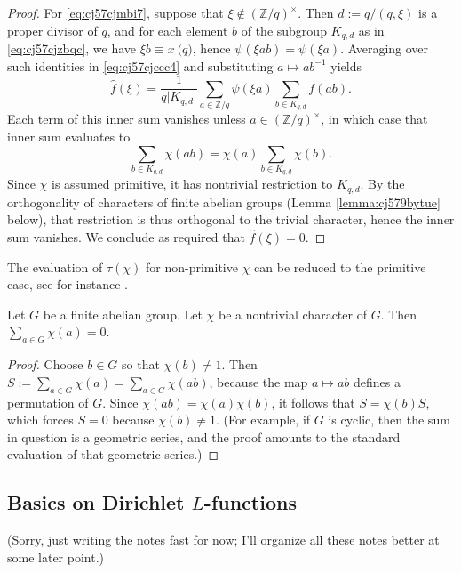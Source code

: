 \documentclass[reqno]{amsart}  \numberwithin{theorem}{section} \numberwithin{equation}{section}
\begin{document}
\begin{proof}
  For \eqref{eq:cj57cjmbi7}, suppose that $\xi \notin (\mathbb{Z} / q)^\times$.  Then $d := q / (q,\xi)$ is a proper divisor of $q$, and for each element $b$ of the subgroup $K_{q, d}$ as in \eqref{eq:cj57cjzbqc}, we have $\xi b \equiv x \pod{q}$, hence $\psi (\xi a b) = \psi (\xi a)$.  Averaging over such identities in \eqref{eq:cj57cjccc4} and substituting $a \mapsto a b^{-1} $ yields
  \begin{equation*}
    \hat{f} (\xi ) = \frac{1}{q \lvert K_{q, d} \rvert}
    \sum_{a \in \mathbb{Z} / q}
    \psi (\xi a)
    \sum_{b \in K_{q, d}}
    f (a b).
  \end{equation*}
  Each term of this inner sum vanishes unless $a \in (\mathbb{Z} / q)^\times$, in which case that inner sum evaluates to
  \begin{equation*}
    \sum_{b \in K_{q,d}} \chi (a b)
    =
    \chi (a) \sum_{b \in K_{q, d}} \chi (b).
  \end{equation*}
  Since $\chi$ is assumed primitive, it has nontrivial restriction to $K_{q,d}$.  By the orthogonality of characters of finite abelian groups (Lemma \ref{lemma:cj579bytue} below), that restriction is thus orthogonal to the trivial character, hence the inner sum vanishes.  We conclude as required that $\hat{f} (\xi ) = 0$.
\end{proof}

\begin{remark}\label{remark:cj57ckegpb}
  The evaluation of $\tau(\chi)$ for non-primitive $\chi$ can be reduced to the primitive case, see for instance \cite[Lemma 3.1]{MR2061214}.
\end{remark}

\begin{lemma}\label{lemma:cj579bytue}
Let $G$ be a finite abelian group. Let $\chi$ be a nontrivial character of $G$.  Then $\sum_{a \in G} \chi (a) = 0$.
\end{lemma}
\begin{proof}
  Choose $b \in G$ so that $\chi(b) \neq 1$.  Then $S := \sum_{a \in G} \chi(a) = \sum_{a \in G} \chi (a b)$, because the map $a \mapsto a b$ defines a permutation of $G$.  Since $\chi(a b) = \chi(a) \chi(b)$, it follows that $S = \chi(b) S$, which forces $S = 0$ because $\chi(b) \neq 1$.  (For example, if $G$ is cyclic, then the sum in question is a geometric series, and the proof amounts to the standard evaluation of that geometric series.)
\end{proof}

\subsection{Basics on Dirichlet $L$-functions}
(Sorry, just writing the notes fast for now; I'll organize all these notes better at some later point.)
\end{document}
